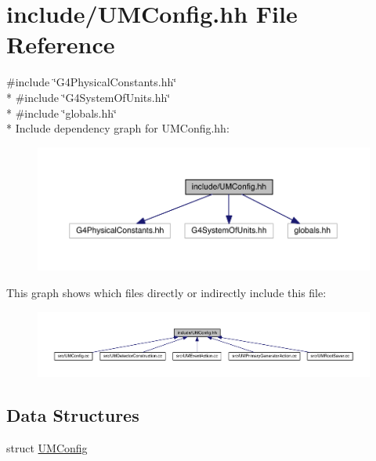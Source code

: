 \hypertarget{UMConfig_8hh}{}\section{include/\+U\+M\+Config.hh File Reference}
\label{UMConfig_8hh}
{\ttfamily \#include \char`\"{}G4\+Physical\+Constants.\+hh\char`\"{}}\\*
{\ttfamily \#include \char`\"{}G4\+System\+Of\+Units.\+hh\char`\"{}}\\*
{\ttfamily \#include \char`\"{}globals.\+hh\char`\"{}}\\*
Include dependency graph for U\+M\+Config.\+hh\+:
\nopagebreak
\begin{figure}[H]
\begin{center}
\leavevmode
\includegraphics[width=350pt]{UMConfig_8hh__incl}
\end{center}
\end{figure}
This graph shows which files directly or indirectly include this file\+:
\nopagebreak
\begin{figure}[H]
\begin{center}
\leavevmode
\includegraphics[width=350pt]{UMConfig_8hh__dep__incl}
\end{center}
\end{figure}
\subsection*{Data Structures}
\begin{DoxyCompactItemize}
\item 
struct \hyperlink{structUMConfig}{U\+M\+Config}
\end{DoxyCompactItemize}
